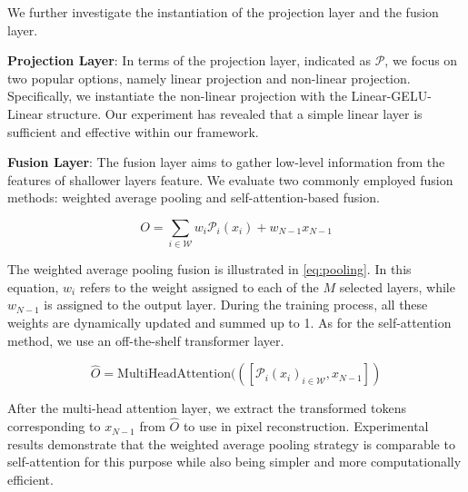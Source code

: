 We further investigate the instantiation of the projection layer and the fusion layer. 

\noindent\textbf{Projection Layer}: In terms of the projection layer, indicated as $\mathcal{P}$, we focus on two popular options, namely linear projection and non-linear projection. Specifically, we instantiate the non-linear projection with the Linear-GELU-Linear structure. Our experiment has revealed that a simple linear layer is sufficient and effective within our framework. 

\noindent\textbf{Fusion Layer}: The fusion layer aims to gather low-level information from the features of shallower layers feature. We evaluate two commonly employed fusion methods: weighted average pooling and self-attention-based fusion. 

\begin{equation}
    \label{eq:pooling}
    O = \sum_{i \in \mathcal{W}}w_i\mathcal{P}_i(x_i) + w_{N-1}x_{N-1}
\end{equation}

 \noindent The weighted average pooling fusion is illustrated in \autoref{eq:pooling}. In this equation, $w_i$ refers to the weight assigned to each of the $M$ selected layers, while $w_{N-1}$ is assigned to the output layer. During the training process, all these weights are dynamically updated and summed up to 1. As for the self-attention method, we use an off-the-shelf transformer layer.

\begin{equation}
    \label{eq:attn}
    \hat{O} = \text{MultiHeadAttention}(([{\mathcal{P}_i(x_i)}_{i \in \mathcal{W}}, x_{N-1}])
\end{equation}

\noindent After the multi-head attention layer, we extract the transformed tokens corresponding to $x_{N-1}$ from $\hat{O}$ to use in pixel reconstruction. Experimental results demonstrate that the weighted average pooling strategy is comparable to self-attention for this purpose while also being simpler and more computationally efficient.

